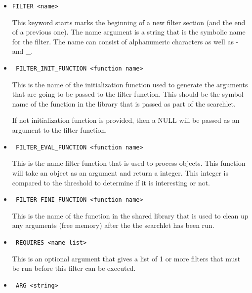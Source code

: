 \begin{itemize}

\item \begin{verbatim}FILTER <name>\end{verbatim}

This keyword starts marks the beginning of a new filter
section (and the end of a previous one).  The name argument is a string
that is the symbolic name for the filter.  The name can consist of
alphanumeric characters as well as - and \_.

\item \begin{verbatim} FILTER_INIT_FUNCTION <function name> \end{verbatim}

This is the name of the initialization function used
to generate the arguments that are going to be passed to
the filter function.  This should be the symbol name of the 
function in the library that is passed as part of the searchlet.

If not initialization function is provided, then a
NULL will be passed as an argument to the filter function.

\item \begin{verbatim} FILTER_EVAL_FUNCTION <function name> \end{verbatim}

This is the name filter function that is used
to process objects.  This function will take an 
object as an argument and return a integer.  This 
integer is compared to the threshold to determine if it
is interesting or not.


\item \begin{verbatim} FILTER_FINI_FUNCTION <function name> \end{verbatim}

This is the name of the function in the shared library that is used
to clean up any arguments (free memory) after the the searchlet
has been run.  

\item \begin{verbatim} REQUIRES <name list> \end{verbatim}

This is an optional argument that gives a list of 1 or more
filters that must be run before this filter can be executed.

\item \begin{verbatim} ARG <string> \end{verbatim}




\end{itemize}
